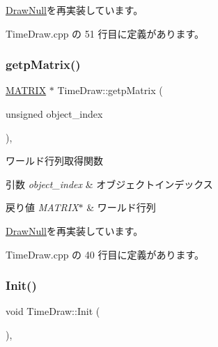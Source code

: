 \mbox{\hyperlink{class_draw_null_a0c1efe55fea325ad277594be6fe1e938}{Draw\+Null}}を再実装しています。



 Time\+Draw.\+cpp の 51 行目に定義があります。

\mbox{\label{class_time_draw_a3624fef571681cf4861891aa073338a0}} 
\subsubsection{\texorpdfstring{getp\+Matrix()}{getpMatrix()}}
{\footnotesize\ttfamily \mbox{\hyperlink{_matrix_8h_a032295cd9fb1b711757c90667278e744}{M\+A\+T\+R\+IX}} $\ast$ Time\+Draw\+::getp\+Matrix (\begin{DoxyParamCaption}\item[{unsigned}]{object\+\_\+index }\end{DoxyParamCaption})\hspace{0.3cm}{\ttfamily [override]}, {\ttfamily [virtual]}}



ワールド行列取得関数 


\begin{DoxyParams}{引数}
{\em object\+\_\+index} & オブジェクトインデックス \\
\hline
\end{DoxyParams}

\begin{DoxyRetVals}{戻り値}
{\em M\+A\+T\+R\+I\+X$\ast$} & ワールド行列 \\
\hline
\end{DoxyRetVals}


\mbox{\hyperlink{class_draw_null_a9aac059eb3b5d1f77e8bd3aa0647cff9}{Draw\+Null}}を再実装しています。



 Time\+Draw.\+cpp の 40 行目に定義があります。

\mbox{\label{class_time_draw_a6a7a80dfac7c27fab8476655348be36a}} 
\subsubsection{\texorpdfstring{Init()}{Init()}}
{\footnotesize\ttfamily void Time\+Draw\+::\+Init (\begin{DoxyParamCaption}{ }\end{DoxyParamCaption})\hspace{0.3cm}{\ttfamily [override]}, {\ttfamily [virtual]}}



